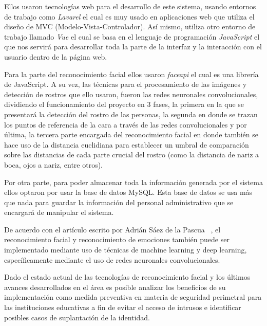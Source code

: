 Ellos usaron tecnologías web para el desarrollo de este sistema, usando entornos de trabajo como \textit{Lavarel} el cual es muy usado en aplicaciones web que utiliza el diseño de MVC (Modelo-Vista-Controlador). 
Así mismo, utiliza otro entorno de trabajo llamado \textit{Vue} el cual se basa en el lenguaje de programación \textit{JavaScript} el que nos servirá para desarrollar toda la parte de la interfaz y la interacción con el usuario dentro de la página web.

Para la parte del reconocimiento facial ellos usaron \textit{faceapi} el cual es una librería de JavaScript. A su vez, las técnicas para el procesamiento de las imágenes y detección de rostros que ello usaron, fueron las redes neuronales convolucionales, dividiendo el funcionamiento del proyecto en 3 fases, la primera en la que se presentará la detección del rostro de las personas, la segunda en donde se trazan los puntos de referencia de la cara a través de las redes convolucionales y por última, la tercera parte encargada del reconocimiento facial en donde también se hace uso de la distancia euclidiana para establecer un umbral de comparación sobre las distancias de cada parte crucial del rostro (como la distancia de nariz a boca, ojos a nariz, entre otros).

Por otra parte, para poder almacenar toda la información generada por el sistema ellos optaron por usar la base de datos MySQL. Esta base de datos se usa más que nada para guardar la información del personal administrativo que se encargará de manipular el sistema.\newline


De acuerdo con el artículo escrito por Adrián Sáez de la Pascua ~\cite{D1}, el reconocimiento facial y reconocimiento de emociones también puede ser implementado mediante uso de técnicas de machine learning y deep learning, específicamente mediante el uso de redes neuronales convolucionales. 


Dado el estado actual de las tecnologías de reconocimiento facial y los últimos avances desarrollados en el área es posible analizar los beneficios de su implementación como medida preventiva en materia de seguridad perimetral para las instituciones educativas a fin de evitar el acceso de intrusos e identificar posibles casos de suplantación de la identidad.


